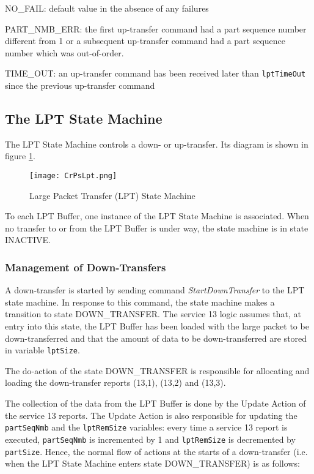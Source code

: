 \documentclass{pnp_article}
\begin{document}
\begin{fw_itemize}
\item NO\_FAIL: default value in the absence of any failures
\item PART\_NMB\_ERR: the first up-transfer command had a part sequence number different from 1 or a subsequent up-transfer command had a part sequence number which was out-of-order.
\item TIME\_OUT: an up-transfer command has been received later than \texttt{lptTimeOut} since the previous up-transfer command
\end{fw_itemize}


\subsection{The LPT State Machine}
The LPT State Machine controls a down- or up-transfer. Its diagram is shown in figure \ref{fig:LPT}.

\begin{figure}[H]
 \centering
 \texttt{[image: CrPsLpt.png]}
 \caption{Large Packet Transfer (LPT) State Machine}
 \label{fig:LPT}
\end{figure}

To each LPT Buffer, one instance of the LPT State Machine is associated. When no transfer to or from the LPT Buffer is under way, the state machine is in state INACTIVE. 

\subsubsection{Management of Down-Transfers}
A down-transfer is started by sending command \textit{StartDownTransfer} to the LPT state machine. In response to this command, the state machine makes a transition to state DOWN\_TRANSFER. The service 13 logic assumes that, at entry into this state, the LPT Buffer has been loaded with the large packet to be down-transferred and that the amount of data to be down-transferred are stored in variable \texttt{lptSize}.

The do-action of the state DOWN\_TRANSFER is responsible for allocating and loading the down-transfer reports (13,1), (13,2) and (13,3).

The collection of the data from the LPT Buffer is done by the Update Action of the service 13 reports. The Update Action is also responsible for updating the \texttt{partSeqNmb} and the \texttt{lptRemSize} variables: every time a service 13 report is executed, \texttt{partSeqNmb} is incremented by 1 and \texttt{lptRemSize} is decremented by \texttt{partSize}. Hence, the normal flow of actions at the starts of a down-transfer (i.e. when the LPT State Machine enters state DOWN\_TRANSFER) is as follows:
\end{document}
